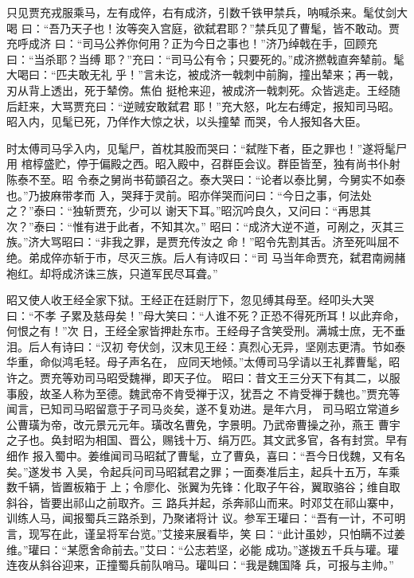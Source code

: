 只见贾充戎服乘马，左有成倅，右有成济，引数千铁甲禁兵，呐喊杀来。髦仗剑大喝
曰：“吾乃天子也！汝等突入宫庭，欲弑君耶？”禁兵见了曹髦，皆不敢动。贾充呼成济
曰：“司马公养你何用？正为今日之事也！”济乃绰戟在手，回顾充曰：“当杀耶？当缚
耶？”充曰：“司马公有令；只要死的。”成济撚戟直奔辇前。髦大喝曰：“匹夫敢无礼
乎！”言未讫，被成济一戟刺中前胸，撞出辇来；再一戟，刃从背上透出，死于辇傍。焦伯
挺枪来迎，被成济一戟刺死。众皆逃走。王经随后赶来，大骂贾充曰：“逆贼安敢弑君
耶！”充大怒，叱左右缚定，报知司马昭。昭入内，见髦已死，乃佯作大惊之状，以头撞辇
而哭，令人报知各大臣。

时太傅司马孚入内，见髦尸，首枕其股而哭曰：“弑陛下者，臣之罪也！”遂将髦尸用
棺椁盛贮，停于偏殿之西。昭入殿中，召群臣会议。群臣皆至，独有尚书仆射陈泰不至。昭
令泰之舅尚书荀顗召之。泰大哭曰：“论者以泰比舅，今舅实不如泰也。”乃披麻带孝而
入，哭拜于灵前。昭亦佯哭而问曰：“今日之事，何法处之？”泰曰：“独斩贾充，少可以
谢天下耳。”昭沉吟良久，又问曰：“再思其次？”泰曰：“惟有进于此者，不知其次。”
昭曰：“成济大逆不道，可剐之，灭其三族。”济大骂昭曰：“非我之罪，是贾充传汝之
命！”昭令先割其舌。济至死叫屈不绝。弟成倅亦斩于市，尽灭三族。后人有诗叹曰：“司
马当年命贾充，弑君南阙赭袍红。却将成济诛三族，只道军民尽耳聋。”

昭又使人收王经全家下狱。王经正在廷尉厅下，忽见缚其母至。经叩头大哭曰：“不孝
子累及慈母矣！”母大笑曰：“人谁不死？正恐不得死所耳！以此弃命，何恨之有！”次
日，王经全家皆押赴东市。王经母子含笑受刑。满城士庶，无不垂泪。后人有诗曰：“汉初
夸伏剑，汉末见王经：真烈心无异，坚刚志更清。节如泰华重，命似鸿毛轻。母子声名在，
应同天地倾。”太傅司马孚请以王礼葬曹髦，昭许之。贾充等劝司马昭受魏禅，即天子位。
昭曰：昔文王三分天下有其二，以服事殷，故圣人称为至德。魏武帝不肯受禅于汉，犹吾之
不肯受禅于魏也。”贾充等闻言，已知司马昭留意于子司马炎矣，遂不复劝进。是年六月，
司马昭立常道乡公曹璜为帝，改元景元元年。璜改名曹免，字景明。乃武帝曹操之孙，燕王
曹宇之子也。奂封昭为相国、晋公，赐钱十万、绢万匹。其文武多官，各有封赏。早有细作
报入蜀中。姜维闻司马昭弑了曹髦，立了曹奂，喜曰：“吾今日伐魏，又有名矣。”遂发书
入吴，令起兵问司马昭弑君之罪；一面奏准后主，起兵十五万，车乘数千辆，皆置板箱于
上；令廖化、张翼为先锋：化取子午谷，翼取骆谷；维自取斜谷，皆要出祁山之前取齐。三
路兵并起，杀奔祁山而来。时邓艾在祁山寨中，训练人马，闻报蜀兵三路杀到，乃聚诸将计
议。参军王瓘曰：“吾有一计，不可明言，现写在此，谨呈将军台览。”艾接来展看毕，笑
曰：“此计虽妙，只怕瞒不过姜维。”瓘曰：“某愿舍命前去。”艾曰：“公志若坚，必能
成功。”遂拨五千兵与瓘。瓘连夜从斜谷迎来，正撞蜀兵前队哨马。瓘叫曰：“我是魏国降
兵，可报与主帅。”

